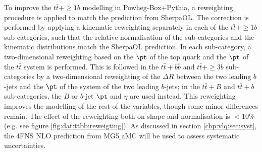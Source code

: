 To improve the $t\bar{t}+\ge1b$ modelling in {\sc Powheg-Box+Pythia}, a reweighting procedure is applied to match the prediction from {\sc SherpaOL}.
The correction is performed by applying a kinematic reweighting separately in each of the $t\bar{t}+\ge1b$ sub-categories, such that the relative normalisation of the sub-categories and the kinematic distributions match the {\sc SherpaOL} prediction. In each sub-category, a two-dimensional reweighting based on the $\pt$ of the top quark and the $\pt$ of the $t\bar{t}$ system is performed. This is followed in the $t\bar{t}+b\bar{b}$ and $t\bar{t}+\ge3b$ sub-categories by a two-dimensional reweighting of the $\Delta R$ between the two leading $b$-jets and the $\pt$ of the system of the two leading $b$-jets; in the $t\bar{t}+B$ and $t\bar{t}+b$ sub-categories, the $B$ or $b$-jet $\pt$ and $\eta$ are used instead.
This reweighting improves the modelling of the rest of the variables, though some minor differences remain. The effect of the reweighting both on shape and normalisation is $<10\%$ (e.g. see figure \ref{fig:dat:ttbb:reweigting}). 
 As discussed in section \ref{chp:vlq:sec:syst}, the 4FNS NLO prediction from {\sc MG5$\_$aMC} will be used to assess systematic uncertainties. 
 
